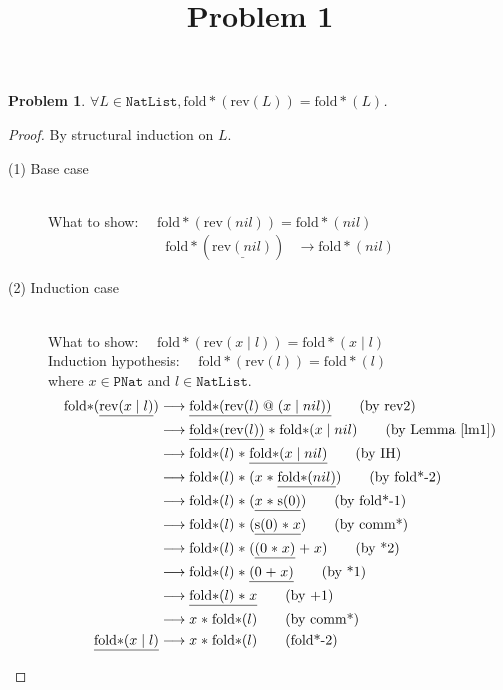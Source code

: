 \documentclass[12pt, a4paper]{article}
\title{Problem 1}
\date{\vspace{-5ex}}
\newtheorem{problem}{Problem}
\newcommand{\rel}[1]{\mathrel{#1}}
\newcommand{\rmx}[1]{\mathrm{#1}}
\newcommand{\larrow}{\longrightarrow}
\newcommand{\under}{\underline}
\begin{document}
\maketitle

\begin{problem}
$\forall L \in \mathtt{NatList}, \rmx{fold*}(\rmx{rev}(L)) = \rmx{fold*}(L)$.
\end{problem}
\begin{proof}
By structural induction on $L$.

\begin{description}

\item[(1) Base case]~\\
\noindent
What to show: $\quad\rmx{fold*}(\rmx{rev}(nil)) = \rmx{fold*}(nil)$
\begin{align*}
\rmx{fold*}(\under{\rmx{rev}(nil)}) &\larrow \rmx{fold*}(nil) \tag{by rev1}
\end{align*}

\item[(2) Induction case]~\\
What to show: $\quad\rmx{fold*}(\rmx{rev}(x \rel{|} l)) = \rmx{fold*}(x \rel{|} l)$\\
Induction hypothesis: $\quad\rmx{fold*}(\rmx{rev}(l)) = \rmx{fold*}(l)$\\
where $x \in \mathtt{PNat}$ and $l \in \mathtt{NatList}$.
\begin{align*}
\rmx{fold*}(\under{\rmx{rev}(x \rel{|} l)}) 
	&\larrow \under{\rmx{fold*}(\rmx{rev}(l)\rel{@}(x \rel{|} nil))} \tag{by rev2} \\
	&\larrow \under{\rmx{fold*}(\rmx{rev}(l))} \rel{*} \rmx{fold*}(x \rel{|} nil) \tag{by Lemma~\ref{lm1}} \\
	&\larrow \rmx{fold*}(l) \rel{*} \under{\rmx{fold*}(x \rel{|} nil)} \tag{by IH} \\
	&\larrow \rmx{fold*}(l) \rel{*} (x \rel{*} \under{\rmx{fold*}(nil)}) \tag{by fold*-2} \\
	&\larrow \rmx{fold*}(l) \rel{*} (\under{x \rel{*} \rmx{s}(0)}) \tag{by fold*-1} \\
	&\larrow \rmx{fold*}(l) \rel{*} (\under{\rmx{s}(0) \rel{*} x}) \tag{by comm*} \\
	&\larrow \rmx{fold*}(l) \rel{*} (\under{(0 \rel{*} x)} \rel{+} x) \tag{by *2} \\
	&\larrow \rmx{fold*}(l) \rel{*} \under{(0 \rel{+} x)} \tag{by *1} \\
	&\larrow \under{\rmx{fold*}(l) \rel{*} x} \tag{by +1} \\
	&\larrow x \rel{*} \rmx{fold*}(l) \tag{by comm*} \\
\under{\rmx{fold*}(x \rel{|} l)} 
	&\larrow x \rel{*} \rmx{fold*}(l) \tag{fold*-2}
\end{align*}

\end{description}
\end{proof}
\end{document}
